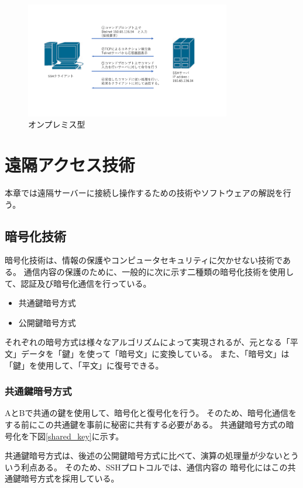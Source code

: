 \documentclass[12pt,a4paper,titlepage]{jreport}
\begin{document}
\begin{figure}[h]
    \centering
    \includegraphics*[width=0.8\textwidth,page=15]{graphs/network_archtecture.pdf}
    \caption{オンプレミス型}
    \label{onpremise_graph}
\end{figure}




\chapter{遠隔アクセス技術}
本章では遠隔サーバーに接続し操作するための技術やソフトウェアの解説を行う。

\section{暗号化技術}
暗号化技術は、情報の保護やコンピュータセキュリティに欠かせない技術である。
通信内容の保護のために、一般的に次に示す二種類の暗号化技術を使用して、認証及び暗号化通信を行っている。
\begin{itemize}
    \item 共通鍵暗号方式
    \item 公開鍵暗号方式
\end{itemize}
それぞれの暗号方式は様々なアルゴリズムによって実現されるが、元となる「平文」データを「鍵」を使って「暗号文」に変換している。
また、「暗号文」は「鍵」を使用して、「平文」に復号できる。

\subsection{共通鍵暗号方式}
AとBで共通の鍵を使用して、暗号化と復号化を行う。
そのため、暗号化通信をする前にこの共通鍵を事前に秘密に共有する必要がある。
共通鍵暗号方式の暗号化を下図\ref{shared_key}に示す。

共通鍵暗号方式は、後述の公開鍵暗号方式に比べて、演算の処理量が少ないとういう利点ある。
そのため、SSHプロトコルでは、通信内容の
暗号化にはこの共通鍵暗号方式を採用している。
\end{document}
